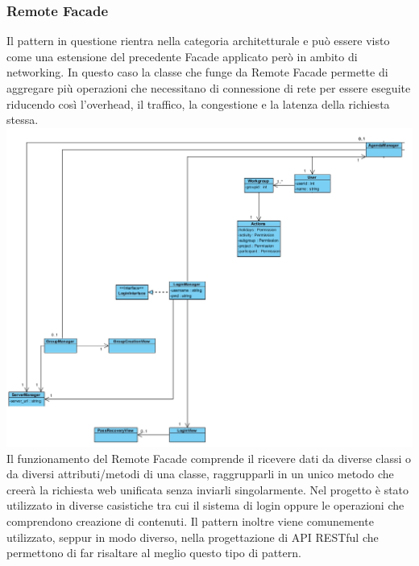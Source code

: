 \documentclass[12pt]{scrartcl}
\begin{document}
\subsubsection{Remote Facade}
Il pattern in questione rientra nella categoria architetturale e pu\`o
essere visto come una estensione del precedente Facade applicato per\`o
in ambito di networking. In questo caso la classe che funge da Remote
Facade permette di aggregare pi\`u operazioni che necessitano di connessione
di rete per essere eseguite riducendo cos\`i l'overhead, il traffico,
la congestione e la latenza della richiesta stessa.\\
    \includegraphics[scale=0.40]{2.png}
Il funzionamento del Remote Facade comprende il ricevere dati da diverse
classi o da diversi attributi/metodi di una classe, raggrupparli in un unico
metodo che creer\`a la richiesta web unificata senza inviarli singolarmente.
Nel progetto \`e stato utilizzato in diverse casistiche tra cui il sistema
di login oppure le operazioni che comprendono creazione di contenuti.
Il pattern inoltre viene comunemente utilizzato, seppur in modo diverso,
nella progettazione di API RESTful che permettono di far risaltare al meglio
questo tipo di pattern.
\end{document}
